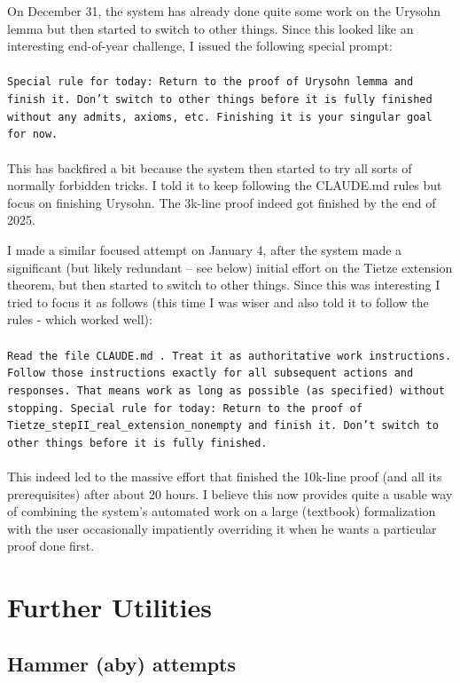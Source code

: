 \documentclass[a4paper,UKenglish,cleveref, autoref, thm-restate]{lipics-v2021}
\begin{document}
On December 31, the system has already done quite some work on the Urysohn lemma but then started to switch to other things. Since this looked like an interesting end-of-year challenge, I issued the following special prompt:\\\\
\texttt{Special rule for
 today: Return to the proof of Urysohn lemma and finish it. Don't switch to other things before it is fully finished without any admits, axioms, etc. Finishing it is your singular goal for now.}\\\\
This has backfired a bit because the system then started to try all sorts of normally forbidden tricks. I told it to keep following the CLAUDE.md rules but focus on finishing Urysohn. The 3k-line proof indeed got finished by the end of 2025.

I made a similar focused attempt on January 4, after the system made a significant (but likely redundant -- see below) initial effort on the Tietze extension theorem, but then started to switch to other things. Since this was interesting I tried to focus it as follows (this time I was wiser and also told it to follow the rules - which worked well):\\\\
\texttt{Read the file CLAUDE.md . Treat it as authoritative work
  instructions. Follow those instructions exactly for all subsequent actions and
  responses. That means work as long as possible (as specified) without
  stopping. Special rule for today: Return to the proof of
  Tietze\_stepII\_real\_extension\_nonempty and finish it. Don't switch to other
  things
  before it is fully finished.}\\\\
This indeed led to the massive effort that finished the 10k-line proof (and all
its prerequisites) after about 20 hours. I believe this now provides quite a
usable way of combining the system's automated work on a large (textbook) formalization with
the user occasionally impatiently overriding it when he wants a particular proof
done first.



\section{Further Utilities}

\subsection{Hammer (aby) attempts}
\end{document}
